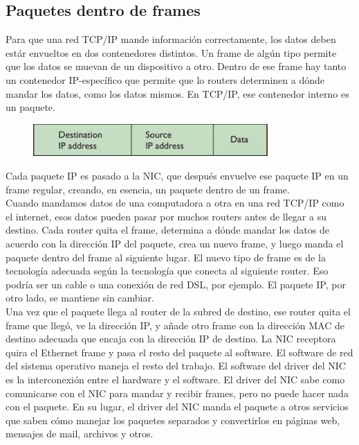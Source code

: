 \documentclass[12pt]{report}
\begin{document}
\subsection{Paquetes dentro de frames}
Para que una red TCP/IP mande información correctamente, los datos deben estár envueltos
en dos contenedores distintos. Un frame de algún tipo permite que los datos 
se muevan de un dispositivo a otro. Dentro de ese frame hay tanto 
un contenedor IP-específico que permite que lo routers determinen a dónde mandar los datos,
como los datos mismos. En TCP/IP, ese contenedor interno es un paquete.

\begin{figure}[h]
\centering
\includegraphics[width=0.8\textwidth]{Paquete.png}
\end{figure}

Cada paquete IP es pasado a la NIC, que después envuelve ese paquete IP en un frame regular, creando,
en esencia, un paquete dentro de un frame.\\
Cuando mandamos datos de una computadora a otra en una red TCP/IP como el internet,
esos datos pueden pasar por muchos routers antes de llegar a su destino. 
Cada router quita el frame, determina a dónde mandar los datos de acuerdo con la dirección IP del paquete,
crea un nuevo frame, y luego manda el paquete dentro del frame al siguiente lugar.
El nuevo tipo de frame es de la tecnología adecuada según la tecnología que
conecta al siguiente router. Eso podría ser un cable o una conexión de red DSL, 
por ejemplo. El paquete IP, por otro lado, se mantiene sin cambiar.\\
Una vez que el paquete llega al router de la subred de destino, ese router quita el frame que llegó,
ve la dirección IP, y añade otro frame con la dirección MAC de destino adecuada que 
encaja con la dirección IP de destino. La NIC receptora quira el Ethernet frame y pasa el resto del paquete
al software. El software de red del sistema operativo maneja el resto del trabajo.
El software del driver del NIC es la interconexión entre el hardware y el software.
El driver del NIC sabe como comunicarse con el NIC para mandar y recibir frames, pero 
no puede hacer nada con el paquete. En su lugar, el driver del NIC manda el paquete a otros servicios
que saben cómo manejar los paquetes separados y convertirlos en páginas web, mensajes de mail,
archivos y otros.
\end{document}
